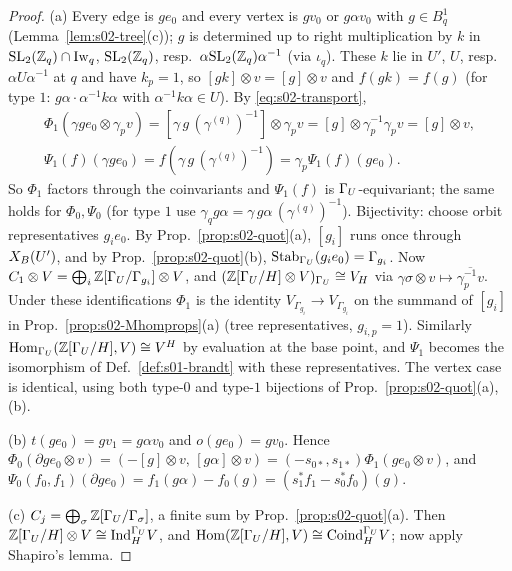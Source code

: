 \begin{proof}
(a) Every edge is $ge_0$ and every vertex is $gv_0$ or $g\alpha v_0$ with $g\in B^1_q$ (Lemma~\ref{lem:s02-tree}(c)); $g$ is determined up to right multiplication
by $k$ in $\mathrm{SL}_2(\mathbb{Z}_q)\cap\mathrm{Iw}_q$, $\mathrm{SL}_2(\mathbb{Z}_q)$, resp.\ $\alpha\mathrm{SL}_2(\mathbb{Z}_q)\alpha^{-1}$ (via $\iota_q$). These $k$ lie in $U'$, $U$, resp.\ $\alpha U\alpha^{-1}$ at $q$ and have
$k_p=1$, so $[gk]\otimes v=[g]\otimes v$ and $f(gk)=f(g)$ (for type $1$: $g\alpha\cdot\alpha^{-1}k\alpha$ with $\alpha^{-1}k\alpha\in U$). By \eqref{eq:s02-transport},
\begin{gather*}\Phi_1(\gamma ge_0\otimes\gamma_pv)=[\gamma\,g\,(\gamma^{(q)})^{-1}]\otimes\gamma_pv=[g]\otimes\gamma_p^{-1}\gamma_pv=[g]\otimes v,\\
\Psi_1(f)(\gamma ge_0)=f(\gamma\,g\,(\gamma^{(q)})^{-1})=\gamma_p\Psi_1(f)(ge_0).\end{gather*}
So $\Phi_1$ factors through the coinvariants and $\Psi_1(f)$ is $\Gamma_U$-equivariant; the same holds for $\Phi_0,\Psi_0$ (for type $1$ use $\gamma_qg\alpha=\gamma\,g\alpha\,(\gamma^{(q)})^{-1}$).
Bijectivity: choose orbit representatives $g_ie_0$. By Prop.~\ref{prop:s02-quot}(a), $[g_i]$ runs once through $X_B(U')$, and by Prop.~\ref{prop:s02-quot}(b),
$\operatorname{Stab}_{\Gamma_U}(g_ie_0)=\Gamma_{g_i}$. Now $C_1\otimes V=\bigoplus_i\mathbb{Z}[\Gamma_U/\Gamma_{g_i}]\otimes V$, and $(\mathbb{Z}[\Gamma_U/H]\otimes V)_{\Gamma_U}\cong V_H$ via $\gamma\sigma\otimes v\mapsto\overline{\gamma_p^{-1}v}$.
Under these identifications $\Phi_1$ is the identity $V_{\Gamma_{g_i}}\to V_{\Gamma_{g_i}}$ on the summand of $[g_i]$ in
Prop.~\ref{prop:s02-Mhomprops}(a) (tree representatives, $g_{i,p}=1$). Similarly $\operatorname{Hom}_{\Gamma_U}(\mathbb{Z}[\Gamma_U/H],V)\cong V^H$ by evaluation at the base point, and $\Psi_1$
becomes the isomorphism of Def.~\ref{def:s01-brandt} with these representatives. The vertex case is identical, using both type-$0$ and type-$1$ bijections of
Prop.~\ref{prop:s02-quot}(a),(b).

(b) $t(ge_0)=gv_1=g\alpha v_0$ and $o(ge_0)=gv_0$. Hence $\Phi_0(\partial ge_0\otimes v)=(-[g]\otimes v,\,[g\alpha]\otimes v)=(-s_{0*},s_{1*})\Phi_1(ge_0\otimes v)$, and
$\Psi_0(f_0,f_1)(\partial ge_0)=f_1(g\alpha)-f_0(g)=(s_1^*f_1-s_0^*f_0)(g)$.

(c) $C_j=\bigoplus_\sigma\mathbb{Z}[\Gamma_U/\Gamma_\sigma]$, a finite sum by Prop.~\ref{prop:s02-quot}(a). Then $\mathbb{Z}[\Gamma_U/H]\otimes V\cong\mathrm{Ind}_H^{\Gamma_U}V$, and
$\operatorname{Hom}(\mathbb{Z}[\Gamma_U/H],V)\cong\mathrm{Coind}_H^{\Gamma_U}V$; now apply Shapiro's lemma.
\end{proof}

